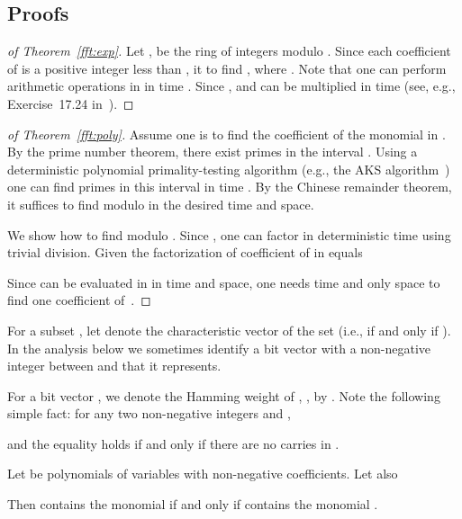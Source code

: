 \subsection{Proofs}

\begin{proof}[of Theorem~\ref{fft:exp}]
Let ,  be the ring of integers modulo . Since each coefficient of  is a positive integer less than , it  to find , where . Note that one can perform arithmetic operations in  in time . Since ,  and  can be multiplied in time  (see, e.g., Exercise~17.24 in~\cite{S2009}).
\end{proof}

\begin{proof}[of Theorem~\ref{fft:poly}]
Assume one is to find the coefficient  of the monomial  in .
By the prime number theorem, there exist   primes in the interval . Using a deterministic polynomial primality-testing algorithm (e.g., the AKS algorithm~\cite{AKS2004}) one can find primes  in this interval in time . By the Chinese remainder theorem, it suffices to find  modulo  in the desired time and space.

We show how to find  modulo . Since , one can factor  in deterministic time  using trivial division. Given the factorization of  coefficient  of  in  equals 

Since  can be evaluated in  in  time and space, one needs  time and only  space to find one coefficient of~.
\end{proof}

For a subset , let  denote the characteristic
vector of the set  (i.e.,  if and only if ). 
In the analysis below we sometimes identify a bit vector  with a non-negative integer between  and  that it represents.

For a bit vector , we denote the Hamming weight of , , by . Note the following simple fact: for any two non-negative integers
 and ,

and the equality holds if and only if there are no carries in .



\begin{lemma}
\label{lemma:binary}
Let  be polynomials of  variables  with non-negative coefficients. Let also 

Then  contains the monomial 
if and only if  contains the monomial .
\end{lemma}

